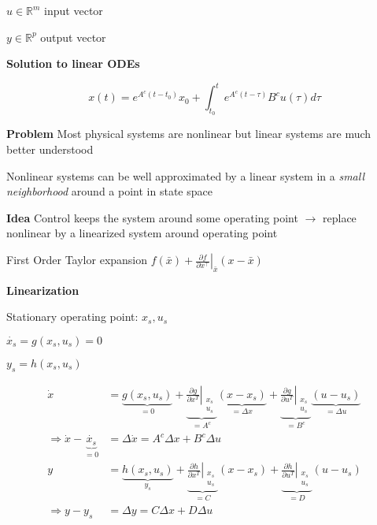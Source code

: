 $u \in \mathbb{R}^m$
input vector

$y \in \mathbb{R}^p$
output vector

\textbf{Solution to linear ODEs}

$$
	x(t) = e^{A^c(t-t_0)}x_0 + \int_{t_0}^{t}e^{A^c(t-\tau)}B^c u(\tau)d\tau
$$

\textbf{Problem}
Most physical systems are nonlinear
but linear systems are much better understood

Nonlinear systems can be well approximated by a linear system
in a \textit{small neighborhood} around a point in state space

\textbf{Idea}
Control keeps the system around some operating point
$\rightarrow$
replace nonlinear by a linearized system around operating point

First Order Taylor expansion
$f(\bar{x}) + \left. \frac{\partial f}{\partial x^\top} \right
	\rvert_{\bar{x}} (x-\bar{x})$

\textbf{Linearization}

Stationary operating point:
$x_s,u_s$

$\dot{x_s} = g(x_s,u_s)=0$

$y_s = h(x_s,u_s)$

$$\begin{aligned}
		\dot{x} & =
		\underbrace{
			g(x_s,u_s)
		}_{=0}
		+
		\underbrace{
		\left.\frac{\partial g}{\partial x^T}\right|_{\substack{x_s \\u_s}}
		}_{=A^c}
		\underbrace{
			(x-x_s)
		}_{=\Delta x}
		+
		\underbrace{
		\left.\frac{\partial g}{\partial u^T}\right|_{\substack{x_s \\u_s}}
		}_{=B^c}
		\underbrace{
			(u-u_s)
		}_{=\Delta u}
		\\
		\Rightarrow
		\dot{x} -
		\underbrace{
			\dot{x_s}
		}_{=0}
		        & = \Delta \dot{x}
		= A^c\Delta x + B^c\Delta u
		\\
		y       & =
		\underbrace{
			h(x_s,u_s)
		}_{y_s}
		+
		\underbrace{
		\left.\frac{\partial h}{\partial x^T}\right|_{\substack{x_s \\u_s}}
		}_{=C}
		(x-x_s)
		+
		\underbrace{
		\left.\frac{\partial h}{\partial u^T}\right|_{\substack{x_s \\u_s}}
		}_{=D}
		(u-u_s)
		\\
		\Rightarrow
		y - y_s & = \Delta y
		= C\Delta x + D\Delta u
		\\
	\end{aligned}$$

